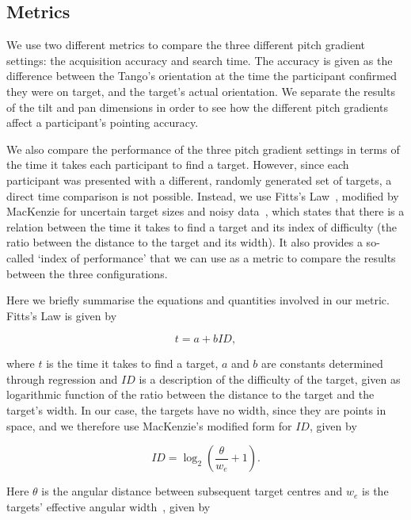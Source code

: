 \documentclass[sigconf, review=true, screen=true, anonymous=true]{acmart}
\begin{document}
\subsection{Metrics}

We use two different metrics to compare the three different pitch gradient settings: the acquisition accuracy and search time.
The accuracy is given as the difference between the Tango's orientation at the time the participant confirmed they were on target, and the target's actual orientation.
We separate the results of the tilt and pan dimensions in order to see how the different pitch gradients affect a participant's pointing accuracy. 

We also compare the performance of the three pitch gradient settings in terms of the time it takes each participant to find a target.
However, since each participant was presented with a different, randomly generated set of targets, a direct time comparison is not possible.
Instead, we use Fitts's Law~\cite{fitts1954information}, modified by MacKenzie for uncertain target sizes and noisy data~\cite{mackenzie1992fitts}, which states that there is a relation between the time it takes to find a target and its index of difficulty (the ratio between the distance to the target and its width).
It also provides a so-called `index of performance' that we can use as a metric to compare the results between the three configurations. 

Here we briefly summarise the equations and quantities involved in our metric.
Fitts's Law is given by  

\begin{equation}
  \label{eq:fitts-base}
  t = a + bID,
\end{equation}

\noindent
where $t$ is the time it takes to find a target, $a$ and $b$ are constants determined through regression and $ID$ is a description of the difficulty of the target, given as logarithmic function of the ratio between the distance to the target and the target's width.
In our case, the targets have no width, since they are points in space, and we therefore use MacKenzie's modified form for $ID$, given by

\begin{equation}
  \label{eq:fitts-id}
  ID = \log_2\left(\frac{\theta}{w_e} + 1\right).
\end{equation}

\noindent
Here $\theta$ is the angular distance between subsequent target centres and $w_e$ is the targets' effective angular width~\cite{welford1968fundamentals}, given by
\end{document}

